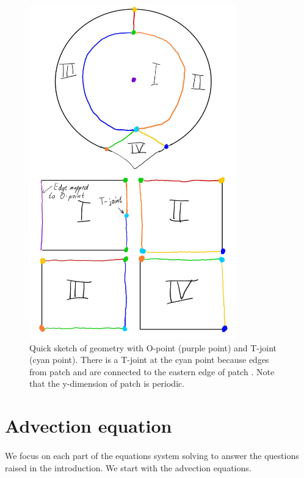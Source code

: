 \documentclass[presentation.tex]{subfiles}
\begin{document}
\begin{figure}
	\centering
	\includegraphics*[width=0.8\textwidth]{images/T-joint_sketch.jpg}
	\caption{\label{Complex_geometry_2}
			  Quick sketch of geometry with O-point (purple point) and T-joint (cyan point).
			  There is a T-joint at the cyan point because 
			  edges from patch {\uppercase\expandafter{}}
			  and {\uppercase\expandafter{}} are connected to the eastern edge
			  of patch {\uppercase\expandafter{}}. 
			  Note that the y-dimension of patch {\uppercase\expandafter{}}
			  is periodic.}
\end{figure}

\newpage


\section{Advection equation}
\paragraph{}
We focus on each part of the equations system solving to answer the questions raised in the introduction. We start with the advection equations. 
\end{document}
